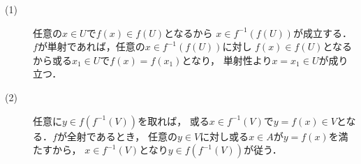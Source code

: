 	\begin{prf}\mbox{}
		\begin{description}
			\item[(1)] 任意の$x \in U$で$f(x) \in f(U)$となるから
				$x \in f^{-1}\left(f(U)\right)$が成立する．
				$f$が単射であれば，任意の$x \in f^{-1}\left(f(U)\right)$に対し
				$f(x) \in f(U)$となるから或る$x_1 \in U$で$f(x) = f(x_1)$となり，
				単射性より$x = x_1 \in U$が成り立つ．
				
			\item[(2)] 任意に$y \in f\left(f^{-1}(V)\right)$を取れば，
				或る$x \in f^{-1}(V)$で$y = f(x) \in V$となる．$f$が全射であるとき，
				任意の$y \in V$に対し或る$x \in A$が$y = f(x)$を満たすから，
				$x \in f^{-1}(V)$となり$y \in f\left(f^{-1}(V)\right)$が従う．
				\QED
		\end{description}
	\end{prf}
	